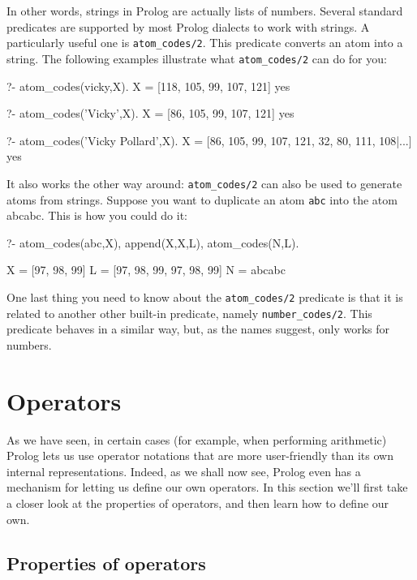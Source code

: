 In other words, strings in Prolog are actually lists of
numbers. Several standard predicates are supported by most Prolog
dialects to work with strings. A particularly useful one is
\texttt{atom\_codes/2}. This predicate converts an atom into a string. The
following examples illustrate what \texttt{atom\_codes/2} can do for you:

\begin{LPNcodedisplay}
?- atom_codes(vicky,X).
X = [118, 105, 99, 107, 121]
yes

?- atom_codes('Vicky',X).
X = [86, 105, 99, 107, 121]
yes

?- atom_codes('Vicky Pollard',X).
X = [86, 105, 99, 107, 121, 32, 80, 111, 108|...]
yes
\end{LPNcodedisplay}

It also works the other way around: \texttt{atom\_codes/2} can also be used
to generate atoms from strings. Suppose you want to duplicate an atom
\texttt{abc} into the atom {abcabc}. This is how you could do it:

\begin{LPNcodedisplay}
?- atom_codes(abc,X), append(X,X,L), atom_codes(N,L).

X = [97, 98, 99]
L = [97, 98, 99, 97, 98, 99]
N = abcabc
\end{LPNcodedisplay}

One last thing you need to know about the \texttt{atom\_codes/2} predicate is
that it is related to another other built-in predicate, namely
\texttt{number\_codes/2}.
This predicate behaves in a similar way, but, as the names suggest, only works for numbers.



\section{Operators}\label{SEC.L9.OPERATORS}


As we have seen, in certain cases (for example, when performing
arithmetic) Prolog lets us use operator notations that are more
user-friendly than its own internal representations.  Indeed, as we
shall now see, Prolog even has a mechanism for letting us define our
own operators.  In this section we'll first take a closer look at the
properties of operators, and then learn how to define our own.


\subsection*{Properties of operators}\label{SUBSEC.L9.OPERATORS.PROP}


